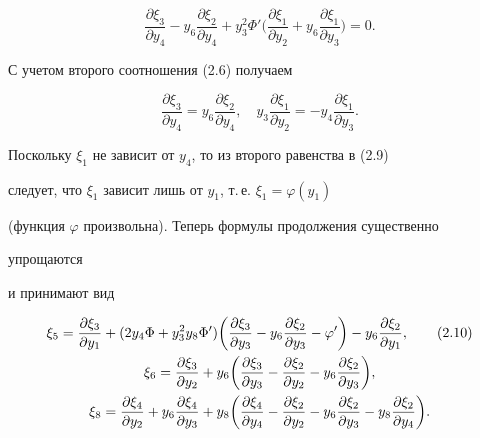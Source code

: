 $$ 


\frac{\partial\xi_3}{\partial y_4}-y_6 


\frac{\partial\xi_2}{\partial y_4}+y^2_3\Phi'\bigg( 


\frac{\partial\xi_1}{\partial y_2}+y_6 


\frac{\partial\xi_1}{\partial y_3}\bigg)=0. 


$$ 


С учетом второго соотношения (2.6) получаем 


\begin{equation} 


\frac{\partial\xi_3}{\partial y_4}=y_6 


\frac{\partial\xi_2}{\partial y_4},\quad 


y_3\frac{\partial\xi_1}{\partial y_2}=-y_4 


\frac{\partial\xi_1}{\partial y_3}.\tag{2.9} 


\end{equation} 


Поскольку $\xi_1$ не зависит от $y_4$, то из второго равенства в (2.9) 


следует, что $\xi_1$ зависит лишь от $y_1$, т.\,е. $\xi_1=\varphi(y_1)$ 


(функция $\varphi$ произвольна). Теперь формулы продолжения существенно 


упрощаются 


и принимают вид 


\begin{gather} 


\xi_5=\frac{\partial\xi_3}{\partial y_1}+(2y_4\Phi+y^2_3y_8\Phi') 


\bigg(\frac{\partial\xi_3}{\partial y_3}-y_6 


\frac{\partial\xi_2}{\partial y_3}-\varphi'\bigg) 


-y_6\frac{\partial\xi_2}{\partial y_1},\tag{2.10}\\ 


% 


\xi_6=\frac{\partial\xi_3}{\partial y_2}+y_6\bigg( 


\frac{\partial\xi_3}{\partial y_3}- 


\frac{\partial\xi_2}{\partial y_2}-y_6 


\frac{\partial\xi_2}{\partial y_3}\bigg),\notag\\ 


% 


\xi_8=\frac{\partial\xi_4}{\partial y_2}+y_6 


\frac{\partial\xi_4}{\partial y_3}+y_8\bigg( 


\frac{\partial\xi_4}{\partial y_4}- 


\frac{\partial\xi_2}{\partial y_2}-y_6 


\frac{\partial\xi_2}{\partial y_3}-y_8 


\frac{\partial\xi_2}{\partial y_4}\bigg).\notag 


\end{gather} 


